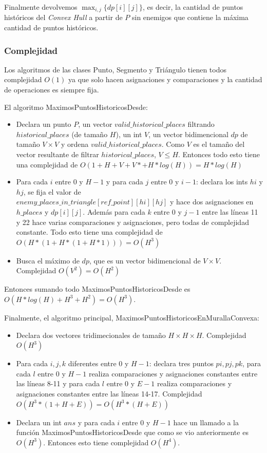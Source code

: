 Finalmente devolvemos $\max_{i,j}\{dp[i][j]\}$, es decir, la cantidad de puntos históricos del \textit{Convex Hull} a partir de $P$
sin enemigos que contiene la máxima cantidad de puntos históricos.

\subsubsection{Complejidad}

Los algoritmos de las clases Punto, Segmento y Triángulo tienen todos complejidad $O(1)$ ya que solo hacen asignaciones y
comparaciones y la cantidad de operaciones es siempre fija.

El algoritmo MaximosPuntosHistoricosDesde:

\begin{itemize}
\item Declara un punto $P$, un vector $valid\_historical\_places$ filtrando $historical\_places$ (de tamaño $H$),
un int $V$, un vector bidimencional $dp$ de tamaño $V \times V$ y ordena $valid\_historical\_places$. Como $V$ es el tamaño
del vector resultante de filtrar $historical\_places$, $V \leq H$.
Entonces todo esto tiene una complejidad de $O(1+H+V+V*+H*log(H)) = H*log(H)$
\item Para cada $i$ entre 0 y $H-1$ y para cada $j$ entre 0 y $i-1$: declara los ints $hi$ y $hj$, se fija el valor de \\
$enemy\_places\_in\_triangle[ref\_point][hi][hj]$ y hace dos asignaciones en $h\_places$ y $dp[i][j]$. Además para cada
$k$ entre 0 y $j-1$ entre las líneas 11 y 22 hace varias comparaciones y asignaciones, pero todas de complejidad constante.
Todo esto tiene una complejidad de $O(H*(1+H*(1+H*1))) = O(H^3)$
\item Busca el máximo de $dp$, que es un vector bidimencional de $V \times V$. Complejidad $O(V^2) = O(H^2)$
\end{itemize}

Entonces sumando todo MaximosPuntosHistoricosDesde es $O(H*log(H)+H^3+H^2) = O(H^3)$.

Finalmente, el algoritmo principal, MaximosPuntosHistoricosEnMurallaConvexa:

\begin{itemize}
\item Declara dos vectores tridimecionales de tamaño $H \times H \times H$. Complejidad $O(H^3)$
\item Para cada $i,j,k$ diferentes entre 0 y $H-1$: declara tres puntos $pi,pj,pk$, para cada $l$ entre 0 y $H-1$
realiza comparaciones y asignaciones constantes entre las líneas 8-11 y para cada $l$ entre 0 y $E-1$
realiza comparaciones y asignaciones constantes entre las líneas 14-17. Complejidad $O(H^3*(1+H+E)) = O(H^3*(H+E))$
\item Declara un int $ans$ y para cada $i$ entre 0 y $H-1$ hace un llamado a la función MaximosPuntosHistoricosDesde que como
se vio anteriormente es $O(H^3)$. Entonces esto tiene complejidad $O(H^4)$.
\end{itemize}

